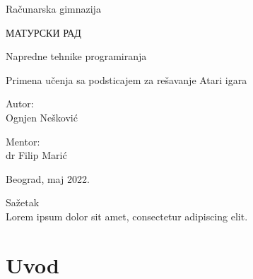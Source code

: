 \documentclass[a4paper,fleqn,12pt]{JMThesis}
\renewcommand{\ch}{\v c}
\renewcommand{\sh}{\v s}
\newcommand{\zh}{\v z}
\theoremstyle{plain}
\theoremstyle{definition}
\theoremstyle{definition}
\begin{document}

\thispagestyle{empty}

\begin{center}
{\LARGE Ra\ch unarska gimnazija}
\end{center}
\vspace*{50mm}

\begin{center}
{\huge МАТУРСКИ РАД}

\vspace*{8pt}
{\Large Napredne tehnike programiranja}
\end{center}

\vspace*{10pt}
\begin{center}
{\LARGE Primena u\ch enja sa podsticajem za re\sh avanje Atari igara}
\end{center}

\vspace*{70mm}
\setlength{\columnsep}{50pt}
\begin{multicols}{2}
 {\noindent \Large Autor:
\\Ognjen Ne\sh ković}


{ \noindent \hfill \Large Mentor:\\
\hfill \phantom{aaaaaaaa}  dr Filip Marić}
\end{multicols}

\vfill
\begin{center}
{\Large Beograd, maj 2022.}
\end{center}

\newpage

\renewcommand{\contentsname}{Sadr\zh aj}
\thispagestyle{empty}
\tableofcontents \clearpage

\renewcommand{\chaptername}{}
\setcounter{page}{1}
\thispagestyle{plain}
{\Large Sa\zh etak}\\ 
Lorem ipsum dolor sit amet, consectetur adipiscing elit.

\chapter[Uvod]{Uvod}
\thispagestyle{plain}
\end{document}
